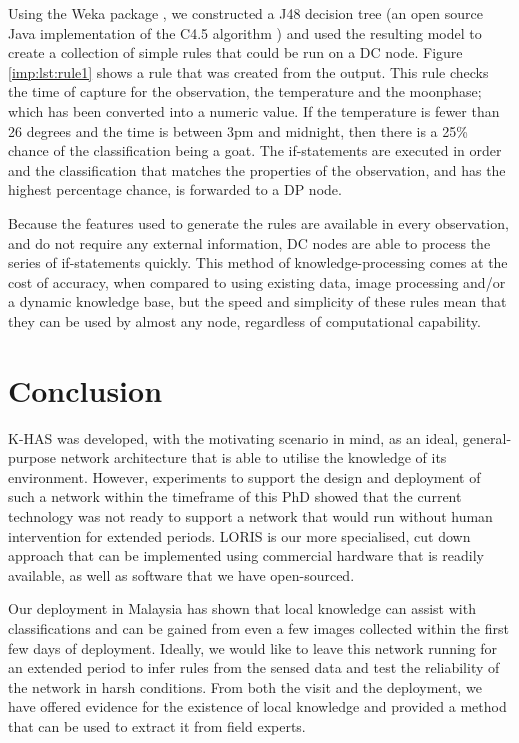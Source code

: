 			Using the Weka package \cite{hall2009weka}, we constructed a J48 decision tree (an open source Java implementation of the C4.5 algorithm \cite{quinlan93}) and used the resulting model to create a collection of simple rules that could be run on a DC node. Figure \ref{imp:lst:rule1} shows a rule that was created from the output. This rule checks the time of capture for the observation, the temperature and the moonphase; which has been converted into a numeric value. If the temperature is fewer than 26 degrees and the time is between 3pm and midnight, then there is a 25\% chance of the classification being a goat. The if-statements are executed in order and the classification that matches the properties of the observation, and has the highest percentage chance, is forwarded to a DP node.
            
            Because the features used to generate the rules are available in every observation, and do not require any external information, DC nodes are able to process the series of if-statements quickly. This method of knowledge-processing comes at the cost of accuracy, when compared to using existing data, image processing and/or a dynamic knowledge base, but the speed and simplicity of these rules mean that they can be used by almost any node, regardless of computational capability. 

	\section{Conclusion}\label{loris:conc}
	 K-HAS was developed, with the motivating scenario in mind, as an ideal, general-purpose network architecture that is able to utilise the knowledge of its environment. However, experiments to support the design and deployment of such a network within the timeframe of this PhD showed that the current technology was not ready to support a network that would run without human intervention for extended periods. LORIS is our more specialised, cut down approach that can be implemented using commercial hardware that is readily available, as well as software that we have open-sourced. 
	
	Our deployment in Malaysia has shown that local knowledge can assist with classifications and can be gained from even a few images collected within the first few days of deployment. Ideally, we would like to leave this network running for an extended period to infer rules from the sensed data and test the reliability of the network in harsh conditions. From both the visit and the deployment, we have offered evidence for the existence of local knowledge and provided a method that can be used to extract it from field experts. 
    
